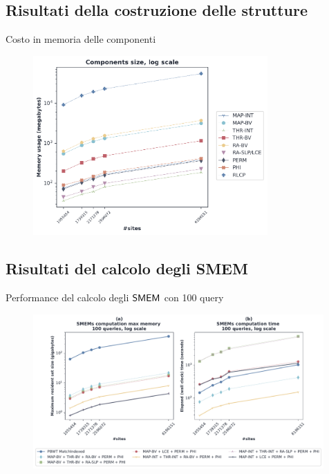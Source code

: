 \documentclass[]{beamer}
\def\SMEM{\mbox{\rm {\sf SMEM}}}
\begin{document}
\subsection{Risultati della costruzione delle strutture}
\begin{frame}{Costo in memoria delle componenti}
  \begin{figure}[H]
    \centering
    \includegraphics[width=0.8\textwidth]{img/comp_mem22.pdf}
  \end{figure}
\end{frame}
\subsection{Risultati del calcolo degli SMEM}
\begin{frame}{Performance del calcolo degli $\SMEM$ con 100 query}
  \begin{figure}[H]
    \centering
    \includegraphics[width=0.99\textwidth]{img/exe_time_mem_paper2.pdf}
  \end{figure}
\end{frame}
\end{document}
